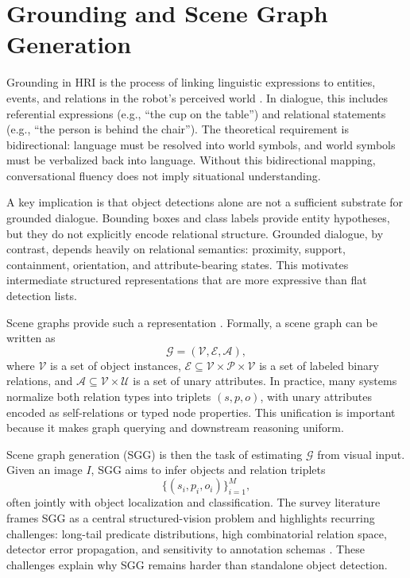   \section{Grounding and Scene Graph Generation}

  Grounding in HRI is the process of linking linguistic expressions to entities, events, and relations in the robot’s perceived world \cite{lemaignan_grounding_2012}. In dialogue, this includes
  referential expressions (e.g., ``the cup on the table'') and relational statements (e.g., ``the person is behind the chair''). The theoretical requirement is bidirectional: language must be resolved
  into world symbols, and world symbols must be verbalized back into language. Without this bidirectional mapping, conversational fluency does not imply situational understanding.

  A key implication is that object detections alone are not a sufficient substrate for grounded dialogue. Bounding boxes and class labels provide entity hypotheses, but they do not explicitly encode
  relational structure. Grounded dialogue, by contrast, depends heavily on relational semantics: proximity, support, containment, orientation, and attribute-bearing states. This motivates intermediate
  structured representations that are more expressive than flat detection lists.

  Scene graphs provide such a representation \cite{johnson_image_2015}. Formally, a scene graph can be written as
  \[
  \mathcal{G}=(\mathcal{V},\mathcal{E},\mathcal{A}),
  \]
  where \(\mathcal{V}\) is a set of object instances, \(\mathcal{E}\subseteq \mathcal{V}\times \mathcal{P}\times \mathcal{V}\) is a set of labeled binary relations, and \(\mathcal{A}\subseteq
  \mathcal{V}\times \mathcal{U}\) is a set of unary attributes. In practice, many systems normalize both relation types into triplets \((s,p,o)\), with unary attributes encoded as self-relations or typed
  node properties. This unification is important because it makes graph querying and downstream reasoning uniform.

  Scene graph generation (SGG) is then the task of estimating \(\mathcal{G}\) from visual input. Given an image \(I\), SGG aims to infer objects and relation triplets
  \[
  \{(s_i,p_i,o_i)\}_{i=1}^{M},
  \]
  often jointly with object localization and classification. The survey literature frames SGG as a central structured-vision problem and highlights recurring challenges: long-tail predicate
  distributions, high combinatorial relation space, detector error propagation, and sensitivity to annotation schemas \cite{zhu_scene_2022}. These challenges explain why SGG remains harder than
  standalone object detection.

